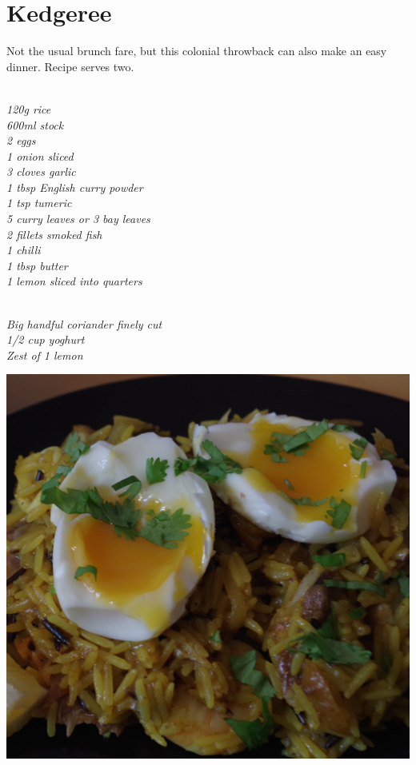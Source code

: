 \documentclass{tufte-book}
\begin{document}
\section{Kedgeree}

Not the usual brunch fare, but this colonial throwback can also make an easy dinner. Recipe serves two.

\smallskip
{}
\\\emph{120g rice
\\600ml stock
\\2 eggs
\\1 onion sliced
\\3 cloves garlic
\\1 tbsp English curry powder
\\1 tsp tumeric
\\5 curry leaves or 3 bay leaves
\\2 fillets smoked fish
\\1 chilli
\\1 tbsp butter
\\1 lemon sliced into quarters
}

\newpage

\\\emph{Big handful coriander finely cut
\\1/2 cup yoghurt
\\Zest of 1 lemon
}

\begin{marginfigure}%
  \includegraphics[width=\linewidth]{kedgeree.png}
\end{marginfigure}
\end{document}
